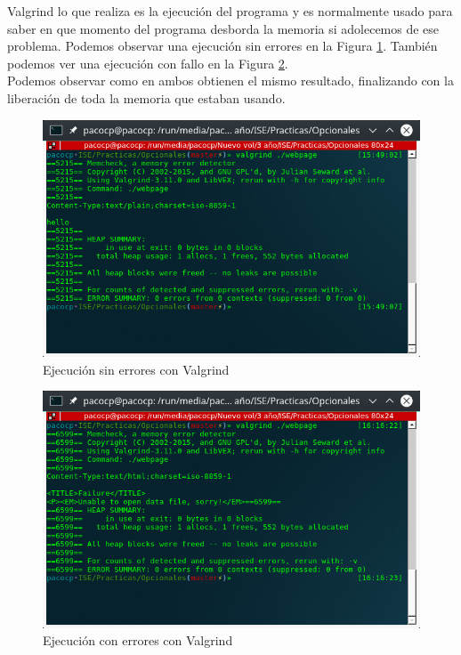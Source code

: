 Valgrind lo que realiza es la ejecución del programa y es normalmente usado para saber en que momento del programa desborda la memoria si adolecemos de ese problema. Podemos observar una ejecución sin errores en la Figura \ref{figura22}. También podemos ver una ejecución con fallo en la Figura \ref{figura23}.\\
Podemos observar como en ambos obtienen el mismo resultado, finalizando con la liberación de toda la memoria que estaban usando.
 

\begin{figure}[H] %
	\centering
	\includegraphics[scale=0.5]{figuras/figura22.png}  %
	
	
	\caption{Ejecución sin errores con Valgrind}
	\label{figura22}
\end{figure}
\begin{figure}[H] %
	\centering
	\includegraphics[scale=0.5]{figuras/figura23.png}  %
	
	
	\caption{Ejecución con errores con Valgrind}
	\label{figura23}
\end{figure}

